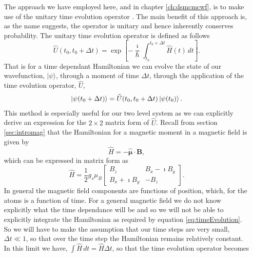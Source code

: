 The approach we have employed here, and in chapter \ref{ch:dsmcmcwf}, is to make use of the unitary time evolution operator \cite{?}.
The main benefit of this approach is, as the name suggests, the operator is unitary and hence inherently conserves probability.
The unitary time evolution operator is defined as follows
\begin{equation}
    \widehat{U}(t_0,t_0+\Delta t) = \exp\left[-\frac{\imath}{\hbar}\int_{t_0}^{t_0+\Delta t} \widehat{H}(t)\,dt \right]. \label{eq:timeEvolution}
\end{equation}
That is for a time dependant Hamiltonian we can evolve the state of our wavefunction, $\vert \psi \rangle$, through a moment of time $\Delta t$, through the application of the time evolution operator, $\widehat{U}$,
\begin{equation*}
    \ket{ \psi (t_0+\Delta t) } = \widehat{U}(t_0,t_0+\Delta t) \ket{ \psi (t_0) }.
\end{equation*}
This method is especially useful for our two level system as we can explicitly derive an expression for the $2\times2$ matrix form of $\widehat{U}$.
Recall from section \ref{sec:intromag} that the Hamiltonian for a magnetic moment in a magnetic field is given by
\begin{equation*}
    \widehat{H} = -\hat{\boldsymbol{\mu}} \cdot \mathbf{B},
\end{equation*}
which can be expressed in matrix form as
\begin{equation*}
    \widehat{H} = \frac{1}{2}g_s\mu_B \begin{bmatrix} B_z & B_x - \imath B_y \\
                                                      B_x + \imath B_y & -B_z \end{bmatrix}.                                          
\end{equation*}
In general the magnetic field components are functions of position, which, for the atoms is a function of time.
For a general magnetic field we do not know explicitly what the time dependance will be and so we will not be able to explicitly integrate the Hamiltonian as required by equation \eqref{eq:timeEvolution}.
So we will have to make the assumption that our time steps are very small, $\Delta t \ll 1$, so that over the time step the Hamiltonian remains relatively constant.
In this limit we have, $\int\widehat{H}\,dt = \widehat{H}\Delta t$, so that the time evolution operator becomes
